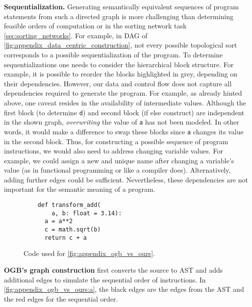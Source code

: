 \documentclass{article}
\begin{document}
\textbf{Sequentialization.} Generating semantically equivalent sequences of program statements from such a directed graph is more challenging than determining feasible orders of computation or in the sorting network task \autoref{sec:sorting_networks}. For example, in DAG of \autoref{fig:appendix_data_centric_construction}, not every possible topological sort corresponds to a possible sequentialization of the program. To determine sequentializations one needs to consider the hierarchical block structure. For example, it is possible to reorder the blocks highlighted in grey, depending on their dependencies. However, our data and control flow does not capture all dependencies required to generate the program. For example, as already hinted above, one caveat resides in the availability of intermediate values. Although the first block (to determine \verb|d|) and second block (if else construct) are independent in the shown graph, \emph{overwriting} the value of \verb|a| has not been modeled. In other words, it would make a difference to swap these blocks since \verb|a| changes its value in the second block. Thus, for constructing a possible sequence of program instructions, we would also need to address changing variable values. For example, we could assign a new and unique name after changing a variable's value (as in functional programming or like a compiler does). Alternatively, adding further edges could be sufficient. Nevertheless, these dependencies are not important for the semantic meaning of a program.


\begin{wrapfigure}[9]{r}{0.45\textwidth}
    \vspace{-15pt}
    \hspace{-25pt}
    \begin{verbatim}
    def transform_add(
        a, b: float = 3.14):
      a = a**2
      c = math.sqrt(b)
      return c + a
    \end{verbatim}
    \caption{Code used for \autoref{fig:appendix_ogb_vs_ours}.\label{fig:appendix_ogb_vs_ours_code}}
\end{wrapfigure}
\textbf{OGB's graph construction} first converts the source to AST and adds additional edges to simulate the sequential order of instructions. In \autoref{fig:appendix_ogb_vs_ours:a}, the black edges are the edges from the AST and the red edges for the sequential order.
\end{document}
